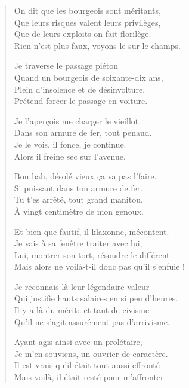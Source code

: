 \begin{verse}
On dit que les bourgeois sont méritants,\\
Que leurs risques valent leurs privilèges,\\
Que de leurs exploits on fait florilège.\\
Rien n’est plus faux, voyons-le sur le champs.

Je traverse le passage piéton\\
Quand un bourgeois de soixante-dix ans,\\
Plein d’insolence et de désinvolture,\\
Prétend forcer le passage en voiture.

Je l’aperçois me charger le vieillot,\\
Dans son armure de fer, tout penaud.\\
Je le vois, il fonce, je continue.\\
Alors il freine sec sur l’avenue.

Bon bah, désolé vieux ça va pas l’faire.\\
Si puissant dans ton armure de fer.\\
Tu t’es arrêté, tout grand manitou,\\
À vingt centimètre de mon genoux.

Et bien que fautif, il klaxonne, mécontent.\\
Je vais à sa fenêtre traiter avec lui,\\
Lui, montrer son tort, résoudre le différent.\\
Mais alors ne voilà-t-il donc pas qu’il s’enfuie !

Je reconnais là leur légendaire valeur\\
Qui justifie hauts salaires en si peu d’heures.\\
Il y a là du mérite et tant de civisme\\
Qu’il ne s’agit assurément pas d’arrivisme.

Ayant agis ainsi avec un prolétaire,\\
Je m’en souviens, un ouvrier de caractère.\\
Il est vrais qu’il était tout aussi effronté\\
Mais voilà, il était resté pour m’affronter.
\end{verse}

